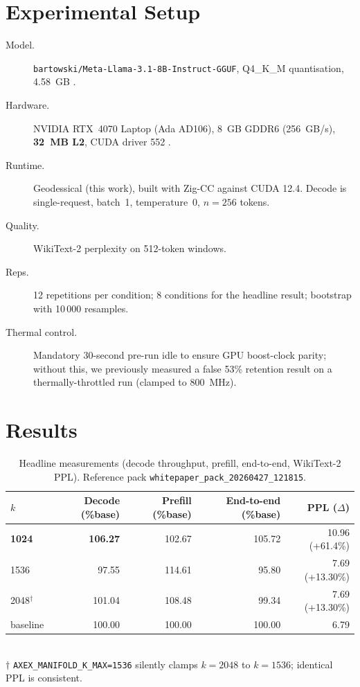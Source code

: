 \documentclass[11pt]{article}
\begin{document}
\section{Experimental Setup}
\label{sec:setup}
\begin{description}
\item[Model.] \texttt{bartowski/Meta-Llama-3.1-8B-Instruct-GGUF}, Q4\_K\_M
quantisation, 4.58~GB \cite{grattafiori2024llama3,ggerganov2023kquants}.
\item[Hardware.] NVIDIA RTX~4070 Laptop (Ada AD106), 8~GB GDDR6 (256~GB/s),
\textbf{32~MB L2}, CUDA driver 552 \cite{nvidia2022ada}.
\item[Runtime.] Geodessical (this work), built with Zig-CC against CUDA 12.4.
Decode is single-request, batch~1, temperature~0, $n{=}256$ tokens.
\item[Quality.] WikiText-2 perplexity \cite{merity2016wikitext} on 512-token
windows.
\item[Reps.] 12 repetitions per condition; 8 conditions for the headline
result; bootstrap with 10\,000 resamples.
\item[Thermal control.] Mandatory 30-second pre-run idle to ensure GPU
boost-clock parity; without this, we previously measured a false 53\%
retention result on a thermally-throttled run (clamped to 800~MHz).
\end{description}

\section{Results}
\label{sec:results}

\begin{table}[h]\centering\small
\caption{Headline measurements (decode throughput, prefill, end-to-end,
WikiText-2 PPL).  Reference pack \texttt{whitepaper\_pack\_20260427\_121815}.}
\label{tab:headline}
\begin{tabular}{@{}lrrrr@{}}
\toprule
$k$ & Decode (\%base) & Prefill (\%base) & End-to-end (\%base) & PPL ($\Delta$) \\
\midrule
\textbf{1024} & \textbf{106.27} & 102.67 & 105.72 & 10.96 (+61.4\%) \\
1536 & 97.55 & 114.61 & 95.80  & 7.69 (+13.30\%) \\
2048$^\dagger$ & 101.04 & 108.48 & 99.34 & 7.69 (+13.30\%) \\
\midrule
baseline & 100.00 & 100.00 & 100.00 & 6.79 \\
\bottomrule
\end{tabular}
\medskip\\
{\footnotesize $\dagger$ \texttt{AXEX\_MANIFOLD\_K\_MAX=1536} silently
clamps $k{=}2048$ to $k{=}1536$; identical PPL is consistent.}
\end{table}
\end{document}
